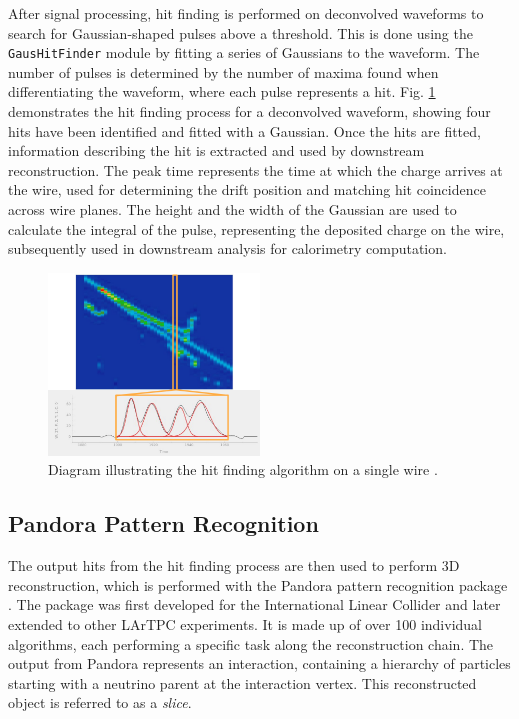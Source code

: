 After signal processing, hit finding is performed on deconvolved waveforms to search for Gaussian-shaped pulses above a threshold.
This is done using the \texttt{GausHitFinder} module \cite{gaushitfinder} by fitting a series of Gaussians to the waveform.         
The number of pulses is determined by the number of maxima found when differentiating the waveform, where each pulse represents a hit. 
Fig. \ref{fig:gaushit} demonstrates the hit finding process for a deconvolved waveform, showing four hits have been identified and fitted with a Gaussian.
Once the hits are fitted, information describing the hit is extracted and used by downstream reconstruction.
The peak time represents the time at which the charge arrives at the wire, used for determining the drift position and matching hit coincidence across wire planes.
The height and the width of the Gaussian are used to calculate the integral of the pulse, representing the deposited charge on the wire, subsequently used in downstream analysis for calorimetry computation.

\begin{figure}[htbp!] 
\centering    
\includegraphics[width=0.5\textwidth]{gaushit}
\caption[Hit Finding Diagram]{
Diagram illustrating the hit finding algorithm on a single wire \cite{EdPhD}.
}
\label{fig:gaushit}
\end{figure}

\subsection{Pandora Pattern Recognition}
\label{sec:pandora}

The output hits from the hit finding process are then used to perform 3D reconstruction, which is performed with the Pandora pattern recognition package \cite{pandora}.
The package was first developed for the International Linear Collider and later extended to other LArTPC experiments.
It is made up of over 100 individual algorithms, each performing a specific task along the reconstruction chain.
The output from Pandora represents an interaction, containing a hierarchy of particles starting with a neutrino parent at the interaction vertex.
This reconstructed object is referred to as a \textit{slice}.

